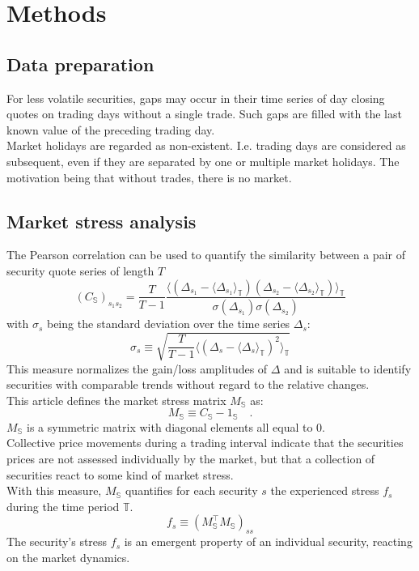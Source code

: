 \documentclass[11pt,twoside,a4paper]{article}
\numberwithin{equation}{section}
\numberwithin{figure}{section}
\numberwithin{table}{section}
\begin{document}
\section{Methods}
\subsection{Data preparation}
For less volatile securities, gaps may occur in their time series of day closing quotes on trading days without a single trade. Such gaps are filled with the last known value of the preceding trading day.\\
Market holidays are regarded as non-existent. I.e. trading days are considered as subsequent, even if they are separated by one or multiple market holidays. The motivation being that without trades, there is no market.
\subsection{Market stress analysis}
The Pearson correlation can be used to quantify the similarity between a pair of security quote series of length $T$
\begin{equation}
\left(C_\mathbb{S}\right)_{s_1s_2}=\frac{T}{T-1}\frac{\langle\left(\Delta_{s_1}-\langle\Delta_{s_1}\rangle_\mathbb{T}\right)\left(\Delta_{s_2}-\langle\Delta_{s_2}\rangle_\mathbb{T}\right)\rangle_\mathbb{T}}{\sigma(\Delta_{s_1})\sigma(\Delta_{s_2})}
\end{equation}
with $\sigma_s$ being the standard deviation over the time series $\Delta_s$:
\begin{equation}
\sigma_s \equiv \sqrt{\frac{T}{T-1}\langle\left(\Delta_{s}-\langle\Delta_{s}\rangle_\mathbb{T}\right)^2\rangle_\mathbb{T}}
\end{equation}
This measure normalizes the gain/loss amplitudes of $\Delta$ and is suitable to identify securities with comparable trends without regard to the relative changes.\\
This article defines the market stress matrix $M_\mathbb{S}$ as:
\begin{equation}
M_\mathbb{S}\equiv C_\mathbb{S} - \textrm{1}_\mathbb{S}\quad.
\end{equation}
$M_\mathbb{S}$ is a symmetric matrix with diagonal elements all equal to $0$.\\

Collective price movements during a trading interval indicate that the securities prices are not assessed individually by the market, but that a collection of securities react to some kind of market stress.\\
With this measure, $M_\mathbb{S}$ quantifies for each security $s$ the experienced stress $f_s$ during the time period $\mathbb{T}$.
\begin{equation}
f_s\equiv (M_\mathbb{S}^\top M_\mathbb{S})_{ss}
\end{equation}
The security's stress $f_s$ is an emergent property of an individual security, reacting on the market dynamics.\\
\end{document}
